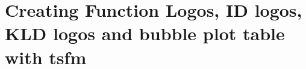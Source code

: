 \documentclass[table,
12pt, %
a4paper, %
oneside, %
headinclude,footinclude, %
BCOR5mm, %
]{scrartcl}
\title{\normalfont\spacedallcaps{}} %
\begin{document}
\renewcommand{\sectionmark}[1]{\markright{\spacedlowsmallcaps{#1}}} %
\lehead{\mbox{\llap{\small\thepage\kern1em\color{halfgray} \vline}\color{halfgray}\hspace{0.5em}\rightmark\hfil}} %
\pagestyle{scrheadings} %
\setcounter{tocdepth}{3} %
\newpage 
\section{Creating Function Logos, ID logos, KLD logos and bubble plot table with tsfm}
\end{document}
